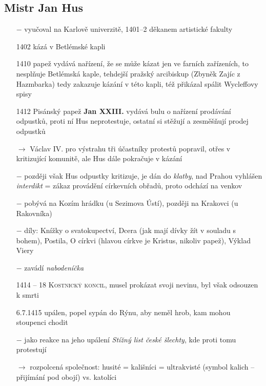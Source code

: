 \documentclass{article}
\begin{document}
\subsection*{Mistr Jan Hus}
\begin{itemize}
    \vspace{-0.5em}
    \setlength\itemsep{0.15em}
    \item[$-$] vyučoval na Karlově univerzitě, 1401--2 děkanem artistické fakulty
    \item[1402] kázá v Betlémské kapli
    \item[1410] papež vydává nařízení, že se může kázat jen ve farních zařízeních, to nesplňuje Betlémská kaple, tehdejší pražský arcibiskup (Zbyněk Zajíc z Hazmbarka) tedy zakazuje kázání v této kapli, též přikázal spálit Wycleffovy spisy
    \item[1412] Pisánský papež \textbf{Jan XXIII.} vydává bulu o nařízení prodávání odpustků, proti ní Hus neprotestuje, ostatní si stěžují a zesměšňují prodej odpustků
    \item[$\rightarrow$] Václav IV. pro výstrahu tři účastníky protestů popravil, otřes v kritizující komunitě, ale Hus dále pokračuje v kázání
    \item[$-$] později však Hus odpustky kritizuje, je dán do \textit{klatby}, nad Prahou vyhlášen \textit{interdikt} = zákaz provádění církevních obřadů, proto odchází na venkov
    \item[$-$] pobývá na Kozím hrádku (u Sezimova Ústí), později na Krakovci (u Rakovníka)
    \item[$-$] díly: Knížky o svatokupectví, Dcera (jak mají dívky žít v souladu s bohem), Postila, O církvi (hlavou církve je Kristus, nikoliv papež), Výklad Viery
    \item[$-$] zavádí \textit{nabodeníčka}
    \item[1414 -- 18] \textsc{Kostnický koncil}, musel prokázat svoji nevinu, byl však odsouzen k smrti
    \item[6.7.1415] upálen, popel sypán do Rýnu, aby neměl hrob, kam mohou stoupenci chodit
    \item[$-$] jako reakce na jeho upálení \textit{Stížný list české šlechty}, kde proti tomu protestují
    \item[$\rightarrow$] rozpolcená společnost: husité = kališníci = ultrakvisté (symbol kalich -- přijímání pod obojí) vs. katolíci
\end{itemize}
\end{document}
